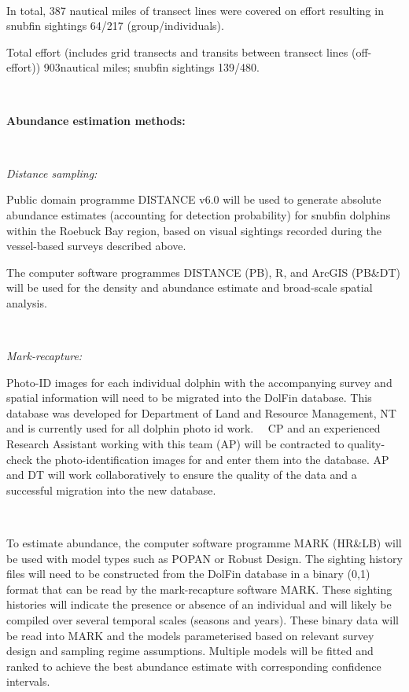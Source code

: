 \documentclass[version=last,
    paper=a4,                               %
    10pt,                                   %
    dvipsnames,
    oneside,                              %
    headings=openany,                       %
    open=any,
    BCOR=7mm,                               %
    DIV=15,     %
]{scrbook}
\begin{document}
~

In total, 387 nautical miles of transect lines were covered on effort
resulting in snubfin sightings 64/217 (group/individuals).

Total effort (includes grid transects and transits between transect
lines (off-effort)) 903nautical miles; snubfin sightings 139/480.

\textbf{~}

\textbf{Abundance estimation methods:}

~

\emph{Distance sampling:}

Public domain programme DISTANCE v6.0 will be used to generate absolute
abundance estimates (accounting for detection probability) for snubfin
dolphins within the Roebuck Bay region, based on visual sightings
recorded during the vessel-based surveys described above.

The computer software programmes DISTANCE (PB), R, and ArcGIS (PB\&DT)
will be used for the density and abundance estimate and broad-scale
spatial analysis.

~

\emph{Mark-recapture:}

Photo-ID images for each individual dolphin with the accompanying survey
and spatial information will need to be migrated into the DolFin
database. This database was developed for Department of Land and
Resource Management, NT and is currently used for all dolphin photo id
work.~~ CP and an experienced Research Assistant working with this team
(AP) will be contracted to quality-check the photo-identification images
for and enter them into the database. AP and DT will work
collaboratively to ensure the quality of the data and a successful
migration into the new database.

~

To estimate abundance, the computer software programme MARK (HR\&LB)
will be used with model types such as POPAN or Robust Design. The
sighting history files will need to be constructed from the DolFin
database in a binary (0,1) format that can be read by the mark-recapture
software MARK. These sighting histories will indicate the presence or
absence of an individual and will likely be compiled over several
temporal scales (seasons and years). These binary data will be read into
MARK and the models parameterised based on relevant survey design and
sampling regime assumptions. Multiple models will be fitted and ranked
to achieve the best abundance estimate with corresponding confidence
intervals.
\end{document}
